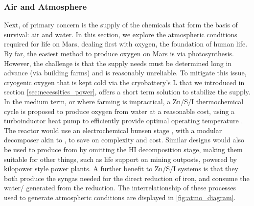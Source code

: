 \documentclass[fleqn,10pt]{Stylesheet} %
\begin{document}
\subsubsection{Air and Atmosphere}
\label{sec:necessities_air}

Next, of primary concern is the supply of the chemicals that form the basis of survival: air and water. In this section, we explore the atmospheric conditions required for life on Mars, dealing first with oxygen, the foundation of human life. By far, the easiest method to produce oxygen on Mars is via photosynthesis. However, the challenge is that the supply needs must be determined long in advance (via building farms) and is reasonably unreliable. To mitigate this issue, cryogenic oxygen that is kept cold via the cryobattery’s L that we introduced in section \ref{sec:necessities_power}, offers a short term solution to stabilize the supply. In the medium term, or where farming is impractical, a Zn/S/I thermochemical cycle \cite{YanweiZhang2013} is proposed to produce oxygen from water at a reasonable cost, using a turboinductor heat pump to efficiently provide optimal operating temperature \cite{JohnBucknellVideo, 2013Dujarric}. The reactor would use an electrochemical bunsen stage \cite{YanweiZhang2016}, with a modular decomposer akin to \cite{Moore&Parma}, to save on complexity and cost. Similar designs would also be used to produce  from  by omitting the HI decomposition stage, making them suitable for other things, such as life support on mining outposts, powered by kilopower style power plants. A further benefit to Zn/S/I systems is that they both produce the syngas needed for the direct reduction of iron, and consume the water/ generated from the reduction. The interrelationship of these processes used to generate atmospheric conditions are displayed in \ref{fig:atmo_diagram}. 
\end{document}

